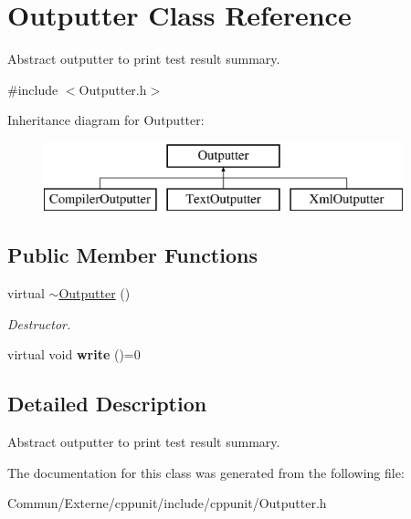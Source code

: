 \hypertarget{class_outputter}{}\section{Outputter Class Reference}
\label{class_outputter}


Abstract outputter to print test result summary.  




{\ttfamily \#include $<$Outputter.\+h$>$}

Inheritance diagram for Outputter\+:\begin{figure}[H]
\begin{center}
\leavevmode
\includegraphics[height=2.000000cm]{class_outputter}
\end{center}
\end{figure}
\subsection*{Public Member Functions}
\begin{DoxyCompactItemize}
\item 
virtual \hyperlink{class_outputter_a0af584ecb81380ff38e3875b65ad4dd5}{$\sim$\+Outputter} ()\hypertarget{class_outputter_a0af584ecb81380ff38e3875b65ad4dd5}{}\label{class_outputter_a0af584ecb81380ff38e3875b65ad4dd5}

\begin{DoxyCompactList}\small\item\em Destructor. \end{DoxyCompactList}\item 
virtual void {\bfseries write} ()=0\hypertarget{class_outputter_a0a5f32693d53ed33ceb8385041cb4b68}{}\label{class_outputter_a0a5f32693d53ed33ceb8385041cb4b68}

\end{DoxyCompactItemize}


\subsection{Detailed Description}
Abstract outputter to print test result summary. 

The documentation for this class was generated from the following file\+:\begin{DoxyCompactItemize}
\item 
Commun/\+Externe/cppunit/include/cppunit/Outputter.\+h\end{DoxyCompactItemize}

